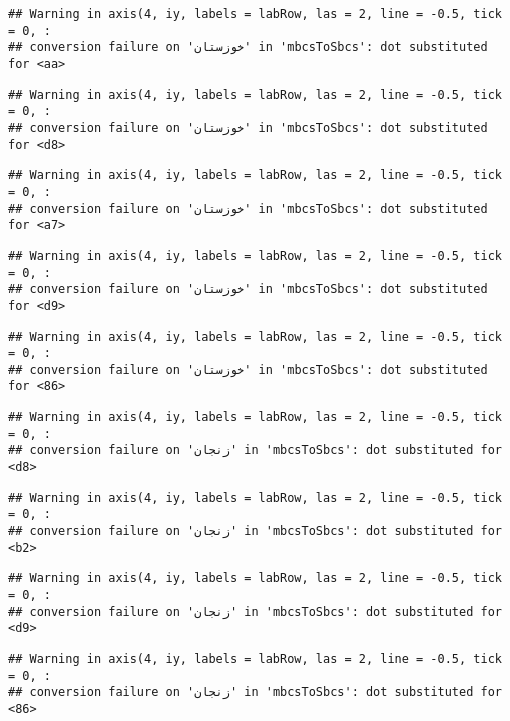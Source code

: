 \documentclass[
]{article}
\begin{document}
\begin{verbatim}
## Warning in axis(4, iy, labels = labRow, las = 2, line = -0.5, tick = 0, :
## conversion failure on 'خوزستان' in 'mbcsToSbcs': dot substituted for <aa>
\end{verbatim}

\begin{verbatim}
## Warning in axis(4, iy, labels = labRow, las = 2, line = -0.5, tick = 0, :
## conversion failure on 'خوزستان' in 'mbcsToSbcs': dot substituted for <d8>
\end{verbatim}

\begin{verbatim}
## Warning in axis(4, iy, labels = labRow, las = 2, line = -0.5, tick = 0, :
## conversion failure on 'خوزستان' in 'mbcsToSbcs': dot substituted for <a7>
\end{verbatim}

\begin{verbatim}
## Warning in axis(4, iy, labels = labRow, las = 2, line = -0.5, tick = 0, :
## conversion failure on 'خوزستان' in 'mbcsToSbcs': dot substituted for <d9>
\end{verbatim}

\begin{verbatim}
## Warning in axis(4, iy, labels = labRow, las = 2, line = -0.5, tick = 0, :
## conversion failure on 'خوزستان' in 'mbcsToSbcs': dot substituted for <86>
\end{verbatim}

\begin{verbatim}
## Warning in axis(4, iy, labels = labRow, las = 2, line = -0.5, tick = 0, :
## conversion failure on 'زنجان' in 'mbcsToSbcs': dot substituted for <d8>
\end{verbatim}

\begin{verbatim}
## Warning in axis(4, iy, labels = labRow, las = 2, line = -0.5, tick = 0, :
## conversion failure on 'زنجان' in 'mbcsToSbcs': dot substituted for <b2>
\end{verbatim}

\begin{verbatim}
## Warning in axis(4, iy, labels = labRow, las = 2, line = -0.5, tick = 0, :
## conversion failure on 'زنجان' in 'mbcsToSbcs': dot substituted for <d9>
\end{verbatim}

\begin{verbatim}
## Warning in axis(4, iy, labels = labRow, las = 2, line = -0.5, tick = 0, :
## conversion failure on 'زنجان' in 'mbcsToSbcs': dot substituted for <86>
\end{verbatim}
\end{document}
